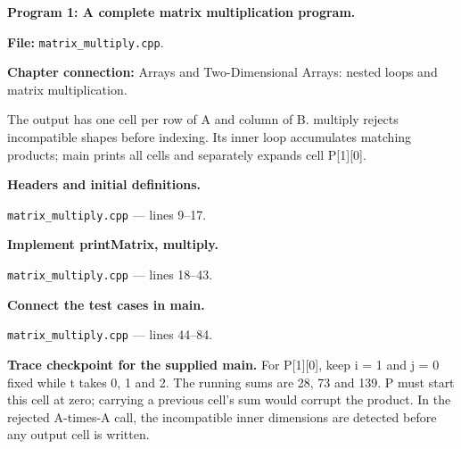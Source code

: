 \textbf{Program 1: A complete matrix multiplication program.}

\textbf{File:} \texttt{matrix\_multiply.cpp}.

\textbf{Chapter connection:} Arrays and Two-Dimensional Arrays: nested loops and matrix multiplication.

The output has one cell per row of A and column of B. multiply rejects incompatible shapes before indexing. Its inner loop accumulates matching products; main prints all cells and separately expands cell P[1][0].



\begin{utpsteps}\setcounter{enumi}{0}\item \textbf{Headers and initial definitions.}\end{utpsteps}

\texttt{matrix\_multiply.cpp} --- lines 9--17.




\tcbbreak

\begin{utpsteps}\setcounter{enumi}{1}\item \textbf{Implement printMatrix, multiply.}\end{utpsteps}

\texttt{matrix\_multiply.cpp} --- lines 18--43.






\tcbbreak

\begin{utpsteps}\setcounter{enumi}{2}\item \textbf{Connect the test cases in main.}\end{utpsteps}

\texttt{matrix\_multiply.cpp} --- lines 44--84.

\textbf{Trace checkpoint for the supplied main.} For P[1][0], keep i = 1 and j = 0 fixed while t takes 0, 1 and 2. The running sums are 28, 73 and 139. P must start this cell at zero; carrying a previous cell's sum would corrupt the product. In the rejected A-times-A call, the incompatible inner dimensions are detected before any output cell is written.





